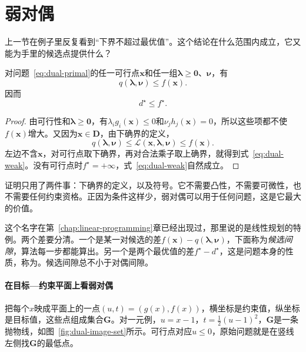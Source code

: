 \section{弱对偶}
\label{sec:dual-weak}

上一节在例子里反复看到“下界不超过最优值”。这个结论在什么范围内成立，它又能为手里的候选点提供什么？

\begin{theorem}[弱对偶]
 \label{thm:dual-weak}
 对问题~\eqref{eq:dual-primal}的任一可行点$\bm{x}$和任一组$\bm{\lambda}\geq\bm{0}$、$\bm{\nu}$，有
 \begin{equation}
  q(\bm{\lambda},\bm{\nu})\leq f(\bm{x}).
  \label{eq:dual-weak-pair}
 \end{equation}
 因而
 \begin{equation}
  d^\star\leq f^\star.
  \label{eq:dual-weak}
 \end{equation}
\end{theorem}

\begin{proof}
 由可行性和$\bm{\lambda}\geq\bm{0}$，有$\lambda_ig_i(\bm{x})\leq0$和$\nu_jh_j(\bm{x})=0$，所以这些项都不使$f(\bm{x})$增大。又因为$\bm{x}\in\bm{D}$，由下确界的定义，
 \[
  q(\bm{\lambda},\bm{\nu})\leq\mathcal{L}(\bm{x},\bm{\lambda},\bm{\nu})\leq f(\bm{x}).
 \]
 左边不含$\bm{x}$，对可行点取下确界，再对合法乘子取上确界，就得到式~\eqref{eq:dual-weak}。没有可行点时$f^\star=+\infty$，式~\eqref{eq:dual-weak}自然成立。
\end{proof}

证明只用了两件事：下确界的定义，以及符号。它不需要凸性，不需要可微性，也不需要任何约束资格。正因为条件这样少，弱对偶可以用于任何问题，这是它最大的价值。

这个名字在第~\ref{chap:linear-programming}章已经出现过，那里说的是线性规划的特例。两个差要分清。一个是某一对候选的差$f(\bm{x})-q(\bm{\lambda},\bm{\nu})$，下面称为\emph{候选间隙}，算法每一步都能算出。另一个是两个最优值的差$f^\star-d^\star$，这是问题本身的性质，称为。候选间隙总不小于对偶间隙。

\paragraph{在目标—约束平面上看弱对偶}
把每个$x$映成平面上的一点$(u,t)=(g(x),f(x))$，横坐标是约束值，纵坐标是目标值，这些点组成集合$\bm{G}$。对一元例，$u=x-1$，$t=\frac12(u-1)^2$，$\bm{G}$是一条抛物线，如图~\ref{fig:dual-image-set}所示。可行点对应$u\leq0$，原始问题就是在竖线左侧找$\bm{G}$的最低点。

